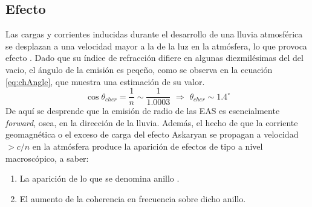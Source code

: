 \subsection{Efecto \cher{}}
\label{sbsc:cher_emision}
	
	Las cargas y corrientes inducidas durante el desarrollo de una lluvia atmosf\'erica se desplazan a una velocidad mayor a la de la luz en la atm\'osfera, lo que provoca efecto \cher{}.
	Dado que su \'indice de refracci\'on difiere en algunas diezmil\'esimas del del vacio, el \'angulo \cher{} de la emisi\'on es peqe\~no, como se observa en la ecuación \ref{eq:chAngle}, que muestra una estimación de su valor.
	\begin{equation}
	\cos\theta_{cher} = \frac{1}{n} \sim \frac{1}{1.0003}
	\,\, \Rightarrow \,\,
	\theta_{cher} \sim 1.4^\circ
	\label{eq:chAngle}
	\end{equation}
	De aqu\'i se desprende que la emisi\'on \cher{} de radio de las EAS es esencialmente \emph{forward}, osea, en la direcci\'on de la lluvia.
	Adem\'as, el hecho de que la corriente geomagn\'etica o el exceso de carga del efecto Askaryan se propagan a velocidad $>c/n$ en la atm\'osfera produce la aparici\'on de efectos de tipo \cher{} a nivel macrosc\'opico, a saber:
	\begin{enumerate}
	 \item La aparici\'on de lo que se denomina anillo \cher{}.
	 \item El aumento de la coherencia en frecuencia sobre dicho anillo.
	\end{enumerate}

	
